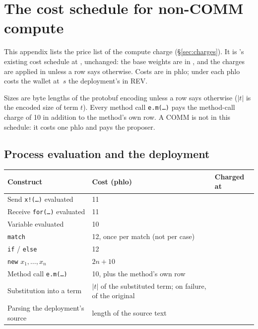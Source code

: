 \section{The cost schedule for non-COMM compute}\label{app:schedule}

This appendix lists the price list of the compute charge (\S\ref{sec:charges}). It is 's existing cost schedule at , unchanged: the base weights are in , and the charges are applied in  unless a row says otherwise. Costs are in phlo; under  each phlo costs the wallet at~$s$ the deployment's  in REV.

Sizes are byte lengths of the protobuf encoding unless a row says otherwise ($|t|$ is the encoded size of term $t$). Every method call \texttt{e.m(\ldots)} pays the method-call charge of 10 in addition to the method's own row. A COMM is not in this schedule: it costs one phlo and pays the proposer.

\subsection{Process evaluation and the deployment}

\begin{longtable}{@{}P{5.4cm}P{5.6cm}P{3.6cm}@{}}
\toprule
\textbf{Construct} & \textbf{Cost (phlo)} & \textbf{Charged at} \\
\midrule
\endhead
Send \texttt{x!(\ldots)} evaluated & 11 &  \\
Receive \texttt{for(\ldots)} evaluated & 11 &  \\
Variable evaluated & 10 &  \\
\texttt{match} & 12, once per match (not per case) &  \\
\texttt{if} / \texttt{else} & 12 &  \\
\texttt{new} $x_1,\ldots,x_n$ & $2n + 10$ &  \\
Method call \texttt{e.m(\ldots)} & 10, plus the method's own row &  \\
Substitution into a term & $|t|$ of the substituted term; on failure, of the original &  \\
Parsing the deployment's source & length of the source text &  \\
\bottomrule
\end{longtable}

